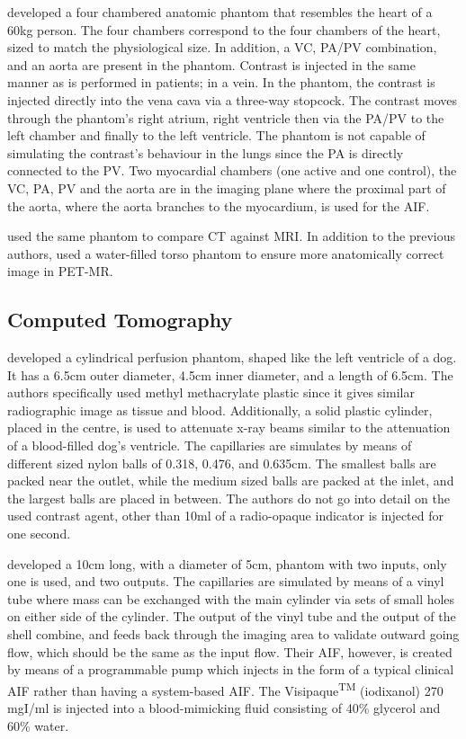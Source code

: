 \cite{chiribiri2013perfusion} developed a four chambered anatomic phantom that resembles the heart of a 60kg person. The four chambers correspond to the four chambers of the heart, sized to match the physiological size. In addition, a \ac{VC}, \ac{PA}/\ac{PV} combination, and an aorta are present in the phantom. Contrast is injected in the same manner as is performed in patients; in a vein. In the phantom, the contrast is injected directly into the vena cava via a three-way stopcock. The contrast moves through the phantom's right atrium, right ventricle then via the \ac{PA}/\ac{PV} to the left chamber and finally to the left ventricle. The phantom is not capable of simulating the contrast's behaviour in the lungs since the \ac{PA} is directly connected to the \ac{PV}. Two myocardial chambers (one active and one control), the \ac{VC}, \ac{PA}, \ac{PV} and the aorta are in the imaging plane where the proximal part of the aorta, where the aorta branches to the myocardium, is used for the \ac{AIF}. 

\cite{otton2013direct} used the same phantom to compare \ac{CT} against \ac{MRI}. In addition to the previous authors, \cite{o2017effect} used a water-filled torso phantom to ensure more anatomically correct image in \ac{PET-MR}.

\subsection{Computed Tomography}
\cite{teslow1991x} developed a cylindrical perfusion phantom, shaped like the left ventricle of a dog. It has a 6.5cm outer diameter, 4.5cm inner diameter, and a length of 6.5cm. The authors specifically used methyl methacrylate plastic since it gives similar radiographic image as tissue and blood. Additionally, a solid plastic cylinder, placed in the centre, is used to attenuate x-ray beams similar to the attenuation of a blood-filled dog's ventricle. The capillaries are simulates by means of different sized nylon balls of 0.318, 0.476, and 0.635cm. The smallest balls are packed near the outlet, while the medium sized balls are packed at the inlet, and the largest balls are placed in between. The authors do not go into detail on the used contrast agent, other than  10ml of a radio-opaque indicator is injected for one second.

\cite{klotz1999perfusion}

\cite{driscoll2011development} developed a 10cm long, with a diameter of 5cm, phantom with two inputs, only one is used, and two outputs. The capillaries are simulated by means of a vinyl tube where mass can be exchanged with the main cylinder via sets of small holes on either side of the cylinder. The output of the vinyl tube and the output of the shell combine, and feeds back through the imaging area to validate outward going flow, which should be the same as the input flow. Their \ac{AIF}, however, is created by means of a programmable pump which injects in the form of a typical clinical \ac{AIF} rather than having a system-based \ac{AIF}. The Visipaque\textsuperscript{TM} (iodixanol) 270 mgI/ml is injected into a blood-mimicking fluid consisting of 40\% glycerol and 60\% water.

